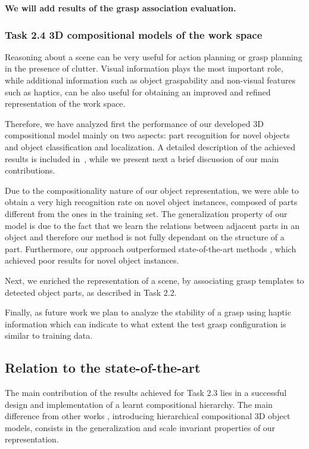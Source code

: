 \documentclass[a4paper,11pt,pdf]{pacmanreport}
\begin{document}
\textbf{We will add results of the grasp association evaluation.}

\subsubsection{Task 2.4 3D compositional models of the work space}

Reasoning about a scene can be very useful for action planning or grasp planning in the presence of clutter. Visual information plays the most important role, while additional information such as object graspability and non-visual features such as haptics, can be also useful for obtaining an improved and refined representation of the work space.

Therefore, we have analyzed first the performance of our developed 3D compositional model mainly on two aspects: part recognition for novel objects and object classification and localization. A detailed description of the achieved results is included in~\cite{Rezapour2015LearningCVPR}, while we present next a brief discussion of our main contributions.

Due to the compositionality nature of our object representation, we were able to obtain a very high recognition rate on novel object instances, composed of parts different from the ones in the training set. The generalization property of our model is due to the fact that we learn the relations between adjacent parts in an object and therefore our method is not fully dependant on the structure of a part. Furthermore, our approach outperformed state-of-the-art methods \cite{vfh}, which achieved poor results for novel object instances.

Next, we enriched the representation of a scene, by associating grasp templates to detected object parts, as described in Task 2.2.

Finally, as future work we plan to analyze the stability of a grasp using haptic information which can indicate to what extent the test grasp configuration is similar to training data.

\subsection{Relation to the state-of-the-art}

The main contribution of the results achieved for Task 2.3 lies in a successful design and implementation of a learnt compositional hierarchy. The main difference from other works \cite{rel2},\cite{comp2} introducing hierarchical compositional 3D object models, consists in the generalization and scale invariant properties of our representation. 
\end{document}
